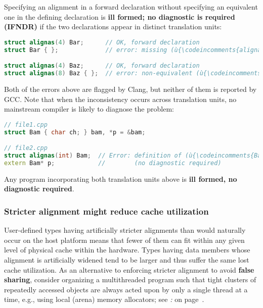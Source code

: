 \noindent Specifying an alignment in a forward declaration without specifying an
equivalent one in the defining declaration is \textbf{ill formed; no diagnostic
is required (IFNDR)} if the two declarations appear in distinct translation
units:

\begin{lstlisting}[language=C++]
struct alignas(4) Bar;      // OK, forward declaration
struct Bar { };             // error: missing (ù{\codeincomments{alignas}}ù) specifier

struct alignas(4) Baz;      // OK, forward declaration
struct alignas(8) Baz { };  // error: non-equivalent (ù{\codeincomments{alignas}}ù) specifier
\end{lstlisting}

\noindent Both of the errors above are flagged by Clang, but neither of them is
reported by GCC. Note that when the inconsistency occurs across
translation units, no mainstream compiler is likely to diagnose the
problem:

\begin{lstlisting}[language=C++]
// file1.cpp
struct Bam { char ch; } bam, *p = &bam;

// file2.cpp
struct alignas(int) Bam;  // Error: definition of (ù{\codeincomments{Bam}}ù) lacks alignment specifier.
extern Bam* p;            //        (no diagnostic required)
\end{lstlisting}

\noindent Any program incorporating both translation units above is
\textbf{ill formed, no diagnostic required}.

\subsubsection[Stricter alignment might reduce cache utilization]{Stricter alignment might reduce cache utilization}\label{stricter-alignment-might-reduce-cache-utilization}

User-defined types having artificially stricter alignments than would
naturally occur on the host platform means that fewer of them can fit
within any given level of physical cache within the hardware. Types
having data members whose alignment is artificially widened tend to be
larger and thus suffer the same lost cache utilization. As an
alternative to enforcing stricter alignment to avoid \textbf{false
sharing}, consider organizing a multithreaded program such that tight
clusters of repeatedly accessed objects are always acted upon by only a
single thread at a time, e.g., using local (arena) memory allocators;
see {\it{}:} {\it{}} on page~\pageref{cache-lines,-l1,-l2,-and-l3-cache,-pages,-and-virtual-memory}.

